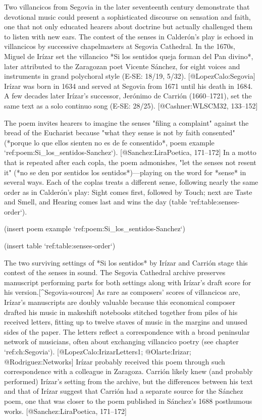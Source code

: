 Two villancicos from Segovia in the later seventeenth century demonstrate that
devotional music could present a sophisticated discourse on sensation and faith,
one that not only educated hearers about doctrine but actually challenged them
to listen with new ears.
The contest of the senses in Calderón's play is echoed in villancicos by
successive chapelmasters at Segovia Cathedral.
In the 1670s, Miguel de Irízar set the villancico *Si los sentidos queja forman
del Pan divino*, later attributed to the Zaragozan poet Vicente Sánchez, for
eight voices and instruments in grand polychoral style (E-SE: 18/19, 5/32).
[@LopezCalo:Segovia]
Irízar was born in 1634 and served at Segovia from 1671 until his death in 1684. 
A few decades later Irízar's successor, Jerónimo de Carrión (1660--1721), set
the same text as a solo continuo song (E-SE: 28/25).
[@Cashner:WLSCM32, 133--152]

The poem invites hearers to imagine the senses "filing a complaint"
against the bread of the Eucharist because "what they sense is not by faith 
consented" (*porque lo que ellos sienten no es de fe consentido*, poem example
`ref:poem:Si_los_sentidos-Sanchez`).
[@Sanchez:LiraPoetica, 171--172]
In a motto that is repeated after each copla, the poem admonishes, "let the
senses not resent it" (*no se den por sentidos los sentidos*)---playing on the
word for *sense* in several ways.
Each of the coplas treats a different sense, following nearly the same order as
in Calderón's play: Sight comes first, followed by Touch; next are Taste and
Smell, and Hearing comes last and wins the day (table `ref:table:senses-order`).

(insert poem example `ref:poem:Si_los_sentidos-Sanchez`)
\label{poem:Si_los_sentidos-Sanchez}

(insert table `ref:table:senses-order`)
\label{table:senses-order}

The two surviving settings of *Si los sentidos* by Irízar and Carrión stage this
contest of the senses in sound. 
The Segovia Cathedral archive preserves manuscript performing parts for both
settings along with Irízar's draft score for his version.[^Segovia-sources]
As rare as composers' scores of villancicos are, Irízar's manuscripts are doubly
valuable because this economical composer drafted his music in makeshift
notebooks stitched together from piles of his received letters, fitting up to
twelve staves of music in the margins and unused sides of the paper.
The letters reflect a correspondence with a broad peninsular network of
musicians, often about exchanging villancico poetry (see chapter
`ref:ch:Segovia`).
[@LopezCalo:IrizarLetters1; @Olarte:Irizar; @Rodriguez:Networks]
Irízar probably received this poem through such correspondence with a colleague
in Zaragoza.
Carrión likely knew (and probably performed) Irízar's setting from the
archive, but the differences between his text and that of Irízar suggest that
Carrión had a separate source for the Sánchez poem, one that was closer to the
poem published in Sánchez's 1688 posthumous works.
[@Sanchez:LiraPoetica, 171--172]

